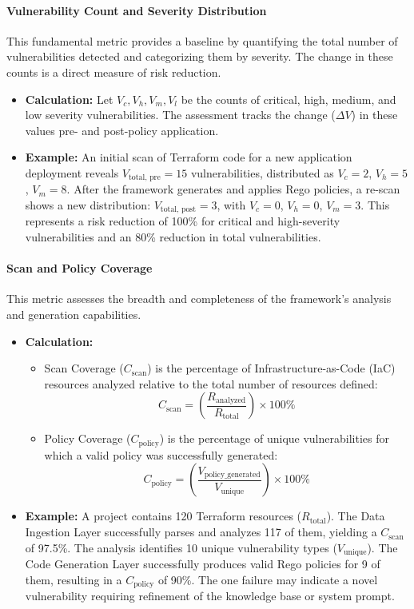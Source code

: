\paragraph{Vulnerability Count and Severity Distribution} This fundamental metric provides a baseline by quantifying the total number of vulnerabilities detected and categorizing them by severity. The change in these counts is a direct measure of risk reduction.
\begin{itemize}
    \item \textbf{Calculation:} Let \( V_c, V_h, V_m, V_l \) be the counts of critical, high, medium, and low severity vulnerabilities. The assessment tracks the change (\( \Delta V \)) in these values pre- and post-policy application.
    \item \textbf{Example:} An initial scan of Terraform code for a new application deployment reveals \( V_{\text{total, pre}} = 15 \) vulnerabilities, distributed as \( V_c = 2 \), \( V_h = 5 \), \( V_m = 8 \). After the framework generates and applies Rego policies, a re-scan shows a new distribution: \( V_{\text{total, post}} = 3 \), with \( V_c = 0 \), \( V_h = 0 \), \( V_m = 3 \). This represents a risk reduction of 100\% for critical and high-severity vulnerabilities and an 80\% reduction in total vulnerabilities.
\end{itemize}

\paragraph{Scan and Policy Coverage} This metric assesses the breadth and completeness of the framework's analysis and generation capabilities.
\begin{itemize}
    \item \textbf{Calculation:}
        \begin{itemize}
            \item Scan Coverage (\( C_{\text{scan}} \)) is the percentage of Infrastructure-as-Code (IaC) resources analyzed relative to the total number of resources defined:
            \[ C_{\text{scan}} = \left(\frac{R_{\text{analyzed}}}{R_{\text{total}}}\right) \times 100\% \]
            \item Policy Coverage (\( C_{\text{policy}} \)) is the percentage of unique vulnerabilities for which a valid policy was successfully generated:
            \[ C_{\text{policy}} = \left(\frac{V_{\text{policy\_generated}}}{V_{\text{unique}}}\right) \times 100\% \]
        \end{itemize}
    \item \textbf{Example:} A project contains 120 Terraform resources (\( R_{\text{total}} \)). The Data Ingestion Layer successfully parses and analyzes 117 of them, yielding a \( C_{\text{scan}} \) of 97.5\%. The analysis identifies 10 unique vulnerability types (\( V_{\text{unique}} \)). The Code Generation Layer successfully produces valid Rego policies for 9 of them, resulting in a \( C_{\text{policy}} \) of 90\%. The one failure may indicate a novel vulnerability requiring refinement of the knowledge base or system prompt.
\end{itemize}

